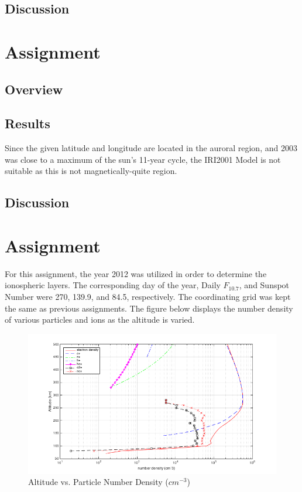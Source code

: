 \subsection{Discussion}



\section{Assignment}
\subsection{Overview}
\subsection{Results}
Since the given latitude and longitude are located in the auroral region, and 2003 was close to a maximum of the sun's 11-year cycle, the IRI2001 Model is not suitable as this is not magnetically-quite region.
\subsection{Discussion}



\section{Assignment}


For this assignment, the year 2012 was utilized  in order to determine the ionospheric layers. The corresponding day of the year, Daily $F_{10.7}$, and Sunspot Number were 270, 139.9, and 84.5, respectively. The coordinating grid was kept the same as previous assignments. The figure below displays the number density of various particles and ions as the altitude is varied. 

	\begin{figure}[h!]
		\centering
		\includegraphics[width=\linewidth]{images/ass5_properties_plot}
		\caption{Altitude vs. Particle Number Density ($cm^{-3}$)}
	\end{figure}

